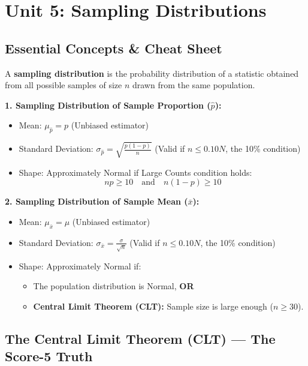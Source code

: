\chapter{Unit 5: Sampling Distributions}

\section{Essential Concepts \& Cheat Sheet}

A \textbf{sampling distribution} is the probability distribution of a statistic obtained from all possible samples of size $n$ drawn from the same population.

\begin{formulabox}
\textbf{1. Sampling Distribution of Sample Proportion ($\hat{p}$):}
\begin{itemize}
    \item Mean: $\mu_{\hat{p}} = p$ (Unbiased estimator)
    \item Standard Deviation: $\sigma_{\hat{p}} = \sqrt{\frac{p(1-p)}{n}}$ (Valid if $n \le 0.10N$, the 10\% condition)
    \item Shape: Approximately Normal if Large Counts condition holds:
    \[
    np \ge 10 \quad \text{and} \quad n(1-p) \ge 10
    \]
\end{itemize}

\textbf{2. Sampling Distribution of Sample Mean ($\bar{x}$):}
\begin{itemize}
    \item Mean: $\mu_{\bar{x}} = \mu$ (Unbiased estimator)
    \item Standard Deviation: $\sigma_{\bar{x}} = \frac{\sigma}{\sqrt{n}}$ (Valid if $n \le 0.10N$, the 10\% condition)
    \item Shape: Approximately Normal if:
    \begin{itemize}
        \item The population distribution is Normal, \textbf{OR}
        \item \textbf{Central Limit Theorem (CLT):} Sample size is large enough ($n \ge 30$).
    \end{itemize}
\end{itemize}
\end{formulabox}

\section{The Central Limit Theorem (CLT) --- The Score-5 Truth}

